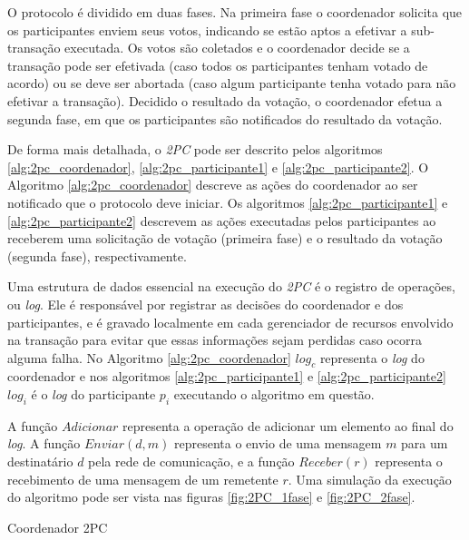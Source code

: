 \documentclass[11pt,twoside,a4paper]{book}
\begin{document}
O protocolo é dividido em duas fases. Na primeira fase o coordenador solicita que os participantes enviem seus votos, indicando se estão aptos a efetivar a sub-transação executada. Os votos são coletados e o coordenador decide se a transação pode ser efetivada (caso todos os participantes tenham votado de acordo) ou se deve ser abortada (caso algum participante tenha votado para não efetivar a transação). Decidido o resultado da votação, o coordenador efetua a segunda fase, em que os participantes são notificados do resultado da votação. 

De forma mais detalhada, o \emph{2PC} pode ser descrito pelos algoritmos \ref{alg:2pc_coordenador}, \ref{alg:2pc_participante1} e  \ref{alg:2pc_participante2}. O Algoritmo \ref{alg:2pc_coordenador} descreve as ações do coordenador ao ser notificado que o protocolo deve  iniciar. Os algoritmos \ref{alg:2pc_participante1} e \ref{alg:2pc_participante2} descrevem as ações executadas pelos participantes ao receberem uma solicitação de votação (primeira fase) e o resultado da votação (segunda fase), respectivamente. 

Uma estrutura de dados essencial na execução do \emph{2PC} é o registro de operações, ou \emph{log}. Ele é responsável por registrar as decisões do coordenador e dos participantes, e é gravado localmente em cada gerenciador de recursos envolvido na transação para evitar que essas informações sejam perdidas caso ocorra alguma falha. No Algoritmo \ref{alg:2pc_coordenador} $log_c$ representa o \emph{log} do coordenador e nos algoritmos \ref{alg:2pc_participante1} e \ref{alg:2pc_participante2} $log_i$ é o \emph{log} do participante $p_i$ executando o algoritmo em questão.

A função $Adicionar$ representa a operação de adicionar um elemento ao final do \emph{log}. A função $Enviar(d, m)$ representa o envio de uma mensagem $m$ para um destinatário $d$ pela rede de comunicação, e a função $Receber(r)$ representa o recebimento de uma mensagem de um remetente $r$. Uma simulação da execução do algoritmo pode ser vista nas figuras \ref{fig:2PC_1fase} e \ref{fig:2PC_2fase}.

\begin{algorithm}
\caption{Coordenador 2PC}
\label{alg:2pc_coordenador}
\end{algorithm}
\end{document}
